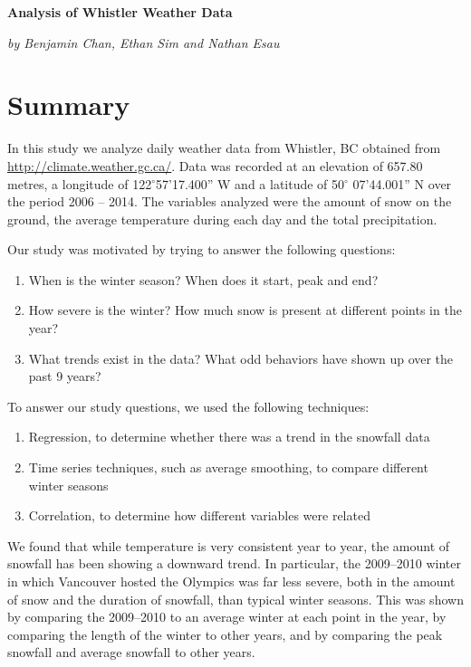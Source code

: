 \documentclass[12pt,twoside]{article}
\begin{document}


%

\thispagestyle{firststyle}
\noindent
{\Large \textbf{Analysis of Whistler Weather Data}} 

\medskip\noindent
{\large \textsl{by Benjamin Chan, Ethan Sim and Nathan Esau}}

\section{Summary}

In this study we analyze daily weather data from Whistler, BC obtained from \url{http://climate.weather.gc.ca/}. Data was recorded at an elevation of 657.80 metres, a longitude of 122$^{\circ}$57'17.400'' W and a latitude of 50$^{\circ}$ 07'44.001'' N over the period 2006 -- 2014. The variables analyzed were the amount of snow on the ground, the average temperature during each day and the total precipitation.

\medskip\noindent
Our study was motivated by trying to answer the following questions:

\begin{enumerate}
\item When is the winter season? When does it start, peak and end?
\item How severe is the winter? How much snow is present at different points in the year? 
\item What trends exist in the data? What odd behaviors have shown up over the past 9 years? 
\end{enumerate}

\noindent
To answer our study questions, we used the following techniques:

\begin{enumerate}
\item Regression, to determine whether there was a trend in the snowfall data
\item Time series techniques, such as average smoothing, to compare different winter seasons
\item Correlation, to determine how different variables were related
\end{enumerate}

\noindent We found that while temperature is very consistent year to year, the amount of snowfall has been showing a downward trend. In particular, the 2009--2010 winter in which Vancouver hosted the Olympics was far less severe, both in the amount of snow and the duration of snowfall, than typical winter seasons. This was shown by comparing the 2009--2010 to an average winter at each point in the year, by comparing the length of the winter to other years, and by comparing the peak snowfall and average snowfall to other years.
\end{document}

